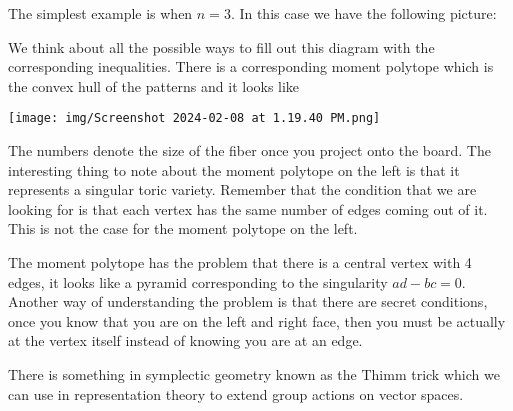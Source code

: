 \documentclass[12pt]{article}
\begin{document}
\begin{example}
    The simplest example is when $n=3$. In this case we have the following picture:
    \begin{center}
    \end{center}
    We think about all the possible ways to fill out this diagram with the corresponding
    inequalities. There is a corresponding moment polytope which is the convex hull of the
    patterns and it looks like 
    \begin{center}
    \texttt{[image: img/Screenshot 2024-02-08 at 1.19.40 PM.png]}
    \end{center}
    The numbers denote the size of the fiber once you project onto the board. 
    The interesting thing to note about the moment polytope on the left is
    that it represents a singular toric variety. Remember that the condition 
    that we are looking for is that each vertex has the same number of edges
    coming out of it. This is not the case for the moment polytope on the left.

    \hfill

    The moment polytope has the problem that there is a central vertex with 4 edges, 
    it looks like a pyramid corresponding to the singularity $ad - bc = 0$. Another way of understanding 
    the problem is that there are secret conditions, once you know that you are on the left and right face,
    then you must be actually at the vertex itself instead of knowing you are at an edge.
\end{example}

There is something in symplectic geometry known as the Thimm trick which we can use in representation theory to
extend group actions on vector spaces.
\end{document}
